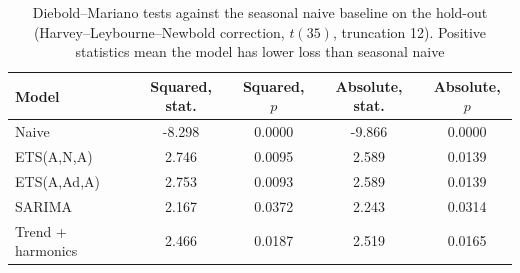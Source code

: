\begin{table}[t]
\centering
\begin{threeparttable}
\caption{Diebold--Mariano tests against the seasonal naive baseline on the hold-out (Harvey--Leybourne--Newbold correction, $t(35)$, truncation 12). Positive statistics mean the model has lower loss than seasonal naive}
\label{tab:dm}
\begin{tabular}{lcccc}
\toprule
Model & Squared, stat. & Squared, $p$ & Absolute, stat. & Absolute, $p$ \\
\midrule
Naive & -8.298 & 0.0000 & -9.866 & 0.0000 \\
ETS(A,N,A) & 2.746 & 0.0095 & 2.589 & 0.0139 \\
ETS(A,Ad,A) & 2.753 & 0.0093 & 2.589 & 0.0139 \\
SARIMA & 2.167 & 0.0372 & 2.243 & 0.0314 \\
Trend + harmonics & 2.466 & 0.0187 & 2.519 & 0.0165 \\
\bottomrule
\end{tabular}
\end{threeparttable}
\end{table}
